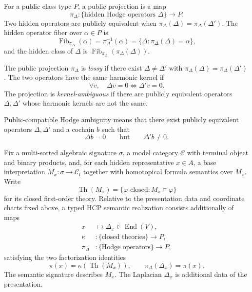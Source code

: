\begin{definition}\label{def:hidden-operator-public-projection}
  For a public class type \(P\), a public projection is a map
  \[
    \pi_\Delta:\{\text{hidden Hodge operators }\Delta\}\longrightarrow P.
  \]
  Two hidden operators are publicly equivalent when
  \(\pi_\Delta(\Delta)=\pi_\Delta(\Delta')\). The hidden operator fiber over
  \(\alpha\in P\) is
  \[
    \operatorname{Fib}_{\pi_\Delta}(\alpha)
    =\pi_\Delta^{-1}(\alpha)
    =\{\Delta:\pi_\Delta(\Delta)=\alpha\},
  \]
  and the hidden class of \(\Delta\) is
  \(\operatorname{Fib}_{\pi_\Delta}(\pi_\Delta(\Delta))\).
\end{definition}

\begin{definition}\label{def:kernel-ambiguity}
  The public projection \(\pi_\Delta\) is \emph{lossy} if there exist
  \(\Delta\ne\Delta'\) with
  \(\pi_\Delta(\Delta)=\pi_\Delta(\Delta')\). The two
  operators have the same harmonic kernel if
  \[
    \forall v,\quad \Delta v=0\Longleftrightarrow \Delta'v=0.
  \]
  The projection is \emph{kernel-ambiguous} if there are publicly equivalent
  operators \(\Delta,\Delta'\) whose harmonic kernels are not the same.
\end{definition}

\begin{definition}\label{def:public-compatible-hodge-ambiguity}
  Public-compatible Hodge ambiguity means that there exist publicly equivalent
  operators \(\Delta,\Delta'\) and a cochain \(b\) such that
  \[
    \Delta b=0
    \qquad\text{but}\qquad
    \Delta'b\ne 0.
  \]
\end{definition}

\begin{definition}\label{def:typed-hcp-realization}
  Fix a multi-sorted algebraic signature \(\sigma\), a model category
  \(\mathcal C\) with terminal object and binary products, and, for each
  hidden representative \(x\in A\), a base
  interpretation \(M_x:\sigma\to\mathcal C_{\mathrm f}\) together with
  homotopical formula semantics over \(M_x\). Write
  \[
    \operatorname{Th}(M_x)
    =\{\varphi\text{ closed}:M_x\vDash\varphi\}
  \]
  for its closed first-order theory. Relative to the presentation data and
  coordinate charts fixed above, a typed HCP semantic realization consists
  additionally of maps
  \[
  \begin{aligned}
    x&\longmapsto\Delta_x\in\operatorname{End}(V),\\
    \kappa&:\{\text{closed theories}\}\longrightarrow P,\\
    \pi_\Delta&:\{\text{Hodge operators}\}\longrightarrow P,
  \end{aligned}
  \]
  satisfying the two factorization identities
  \[
    \pi(x)=\kappa(\operatorname{Th}(M_x)),
    \qquad
    \pi_\Delta(\Delta_x)=\pi(x).
  \]
  The semantic signature describes \(M_x\). The Laplacian \(\Delta_x\)
  is additional data of the presentation.
\end{definition}

